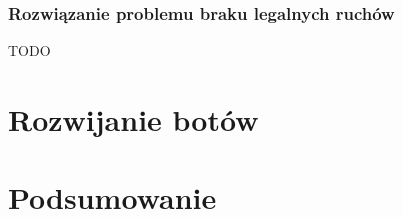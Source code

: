 \documentclass{pracamgr}
\begin{document}
\subsection*{Rozwiązanie problemu braku legalnych ruchów}

TODO

\chapter{Rozwijanie botów}

\chapter{Podsumowanie}

\begin{thebibliography}{99}
\end{thebibliography}
\end{document}
